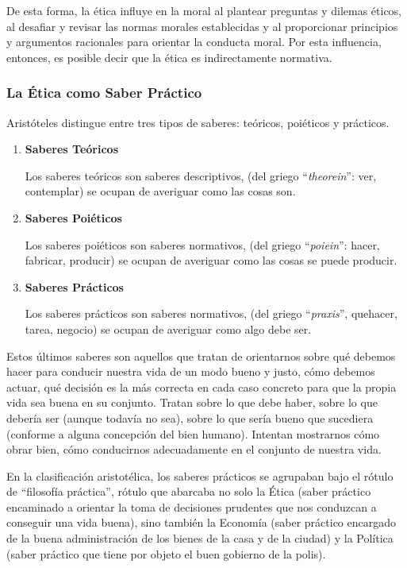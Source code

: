 \documentclass{article}
\begin{document}
De esta forma, la ética influye en la moral al plantear preguntas y dilemas éticos, al desafiar y revisar las normas morales establecidas y al proporcionar principios y argumentos racionales para orientar la conducta moral. Por esta influencia, entonces, es posible decir que la ética es indirectamente normativa.


\subsubsection{La Ética como Saber Práctico}

Aristóteles distingue entre tres tipos de saberes: teóricos, poiéticos y prácticos.

\begin{enumerate}
    \item \textbf{Saberes Teóricos}
    
    Los saberes teóricos son saberes descriptivos, (del griego ``\textit{theorein}'': ver, contemplar) se ocupan de averiguar como las cosas son.

    \item \textbf{Saberes Poiéticos}
    
    Los saberes poiéticos son saberes normativos, (del griego ``\textit{poiein}'': hacer, fabricar, producir) se ocupan de averiguar como las cosas se puede producir.

    \item \textbf{Saberes Prácticos}
    
    Los saberes prácticos son saberes normativos, (del griego ``\textit{praxis}'', quehacer, tarea, negocio) se ocupan de averiguar como algo debe ser.
\end{enumerate}

Estos últimos saberes son aquellos que tratan de orientarnos sobre qué debemos hacer para conducir nuestra vida de un modo bueno y justo, cómo debemos actuar, qué decisión es la más correcta en cada caso concreto para que la propia vida sea buena en su conjunto. Tratan sobre lo que debe haber, sobre lo que debería ser (aunque todavía no sea), sobre lo que sería bueno que sucediera (conforme a alguna concepción del bien humano). Intentan mostrarnos cómo obrar bien, cómo conducirnos adecuadamente en el conjunto de nuestra vida.

En la clasificación aristotélica, los saberes prácticos se agrupaban bajo el rótulo de ``filosofía práctica'', rótulo que abarcaba no solo la Ética (saber práctico encaminado a orientar la toma de decisiones prudentes que nos conduzcan a conseguir una vida buena), sino también la Economía (saber práctico encargado de la buena administración de los bienes de la casa y de la ciudad) y la Política (saber práctico que tiene por objeto el buen gobierno de la polis).
\end{document}
